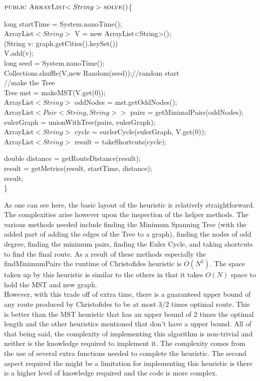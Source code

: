 \documentclass[midd]{thesis}
\newcommand{\tab}{\hspace*{2em}}
\begin{document}
$\textnormal{\scshape public ArrayList$<String>$ solve}()$\{
\begin{codebox}
\tab long startTime = System.nanoTime();\\
\tab ArrayList$<String>$ V = new ArrayList<String>();\\
\tab \For(String v: graph.getCities().keySet()) \\
\tab\tab V.add(v);\\
\tab long seed = System.nanoTime();\\
\tab Collections.shuffle(V,new Random(seed));//random start\\
\tab //make the Tree\\
\tab Tree mst = makeMST(V.get(0));\\
\tab ArrayList$<String>$ oddNodes = mst.getOddNodes();\\
\tab ArrayList$<Pair<String,String>>$ pairs = getMinimalPairs(oddNodes);\\
\tab eulerGraph = unionWithTree(pairs, eulerGraph);\\
\tab ArrayList$<String>$ cycle =  eurlerCycle(eulerGraph, V.get(0));\\
\tab ArrayList$<String>$ result = takeShortcuts(cycle);
\end{codebox}
\begin{codebox}
\tab double distance = getRouteDistance(result);\\
\tab result = getMetrics(result, startTime, distance);\\
\tab \Return result;\\
\}
\end{codebox}
\tab As one can see here, the basic layout of the heuristic is relatively straightforward. The complexities arise however upon the inspection of the helper methods. The various methods needed include finding the Minimum Spanning Tree (with the added part of adding the edges of the Tree to a graph), finding the nodes of odd degree, finding the minimum pairs, finding the Euler Cycle, and taking shortcuts to find the final route. As a result of these methods especially the findMinimumPairs the runtime of Christofides heuristic is $O(N^3)$. The space taken up by this heuristic is similar to the others in that it takes $O(N)$ space to hold the MST and new graph. \\
\tab However, with this trade off of extra time, there is a guaranteed upper bound of any route produced by Christofides to be at most 3/2 times optimal route. This is better than the MST heuristic that has an upper bound of 2 times the optimal length and the other heuristics mentioned that don't have a upper bound. All of that being said, the complexity of implementing this algorithm is non-trivial and neither is the knowledge required to implement it. The complexity comes from the use of several extra functions needed to  complete the heuristic. The second aspect required the might be a limitation for implementing this heuristic is there is a higher level of knowledge required and the code is more complex.
\end{document}
